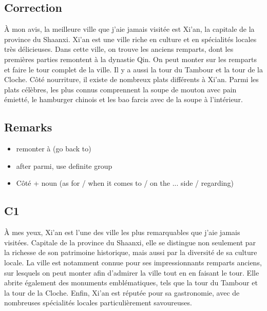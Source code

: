 \documentclass{book}
\begin{document}
    \subsection{Correction}
        À mon avis, la meilleure ville que j'aie jamais visitée est Xi'an, la capitale de la province du Shaanxi.
        Xi'an est une ville riche en culture et en spécialités locales très délicieuses.
        Dans cette ville, on trouve les anciens remparts, dont les premières parties remontent à la dynastie Qin.
        On peut monter sur les remparts et faire le tour complet de la ville.
        Il y a aussi la tour du Tambour et la tour de la Cloche.
        Côté nourriture, il existe de nombreux plats différents à Xi'an.
        Parmi les plats célèbres, les plus connus comprennent la soupe de mouton avec pain émietté, le hamburger chinois et les bao farcis avec de la soupe à l'intérieur.

    \subsection{Remarks}
        \begin{itemize}
            \item remonter à (go back to)
            \item after parmi, use definite group
            \item Côté + noun (as for / when it comes to / on the ... side / regarding)
        \end{itemize}

    \subsection{C1}
        À mes yeux, Xi'an est l'une des ville les plus remarquables que j'aie jamais visitées.
        Capitale de la province du Shaanxi, elle se distingue non seulement par la richesse de son patrimoine historique, mais aussi par la diversité de sa culture locale.
        La ville est notamment connue pour ses impressionnants remparts anciens, sur lesquels on peut monter afin d'admirer la ville tout en en faisant le tour.
        Elle abrite également des monuments emblématiques, tels que la tour du Tambour et la tour de la Cloche.
        Enfin, Xi'an est réputée pour sa gastronomie, avec de nombreuses spécialités locales particulièrement savoureuses.
\end{document}
